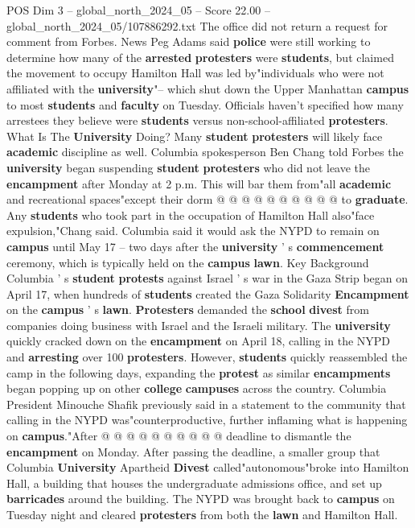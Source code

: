 \begin{textsample}{POS Dim 3 – global\_north\_2024\_05 – Score 22.00 – global\_north\_2024\_05/107886292.txt}
The office did not return a request for comment from Forbes.
News Peg Adams said \textbf{police} were still working to determine how many of the \textbf{arrested} \textbf{protesters} were \textbf{students}, but claimed the movement to occupy Hamilton Hall was led by"individuals who were not affiliated with the \textbf{university}"-- which shut down the Upper Manhattan \textbf{campus} to most \textbf{students} and \textbf{faculty} on Tuesday.
Officials haven't specified how many arrestees they believe were \textbf{students} versus non-school-affiliated \textbf{protesters}.
What Is The \textbf{University} Doing?
Many \textbf{student} \textbf{protesters} will likely face \textbf{academic} discipline as well.
Columbia spokesperson Ben Chang told Forbes the \textbf{university} began suspending \textbf{student} \textbf{protesters} who did not leave the \textbf{encampment} after Monday at 2 p.m.
This will bar them from"all \textbf{academic} and recreational spaces"except their dorm @ @ @ @ @ @ @ @ @ @ to \textbf{graduate}.
Any \textbf{students} who took part in the occupation of Hamilton Hall also"face expulsion,"Chang said.
Columbia said it would ask the NYPD to remain on \textbf{campus} until May 17 -- two days after the \textbf{university} ' s \textbf{commencement} ceremony, which is typically held on the \textbf{campus} \textbf{lawn}.
Key Background Columbia ' s \textbf{student} \textbf{protests} against Israel ' s war in the Gaza Strip began on April 17, when hundreds of \textbf{students} created the Gaza Solidarity \textbf{Encampment} on the \textbf{campus} ' s \textbf{lawn}. \textbf{Protesters} demanded the \textbf{school} \textbf{divest} from companies doing business with Israel and the Israeli military.
The \textbf{university} quickly cracked down on the \textbf{encampment} on April 18, calling in the NYPD and \textbf{arresting} over 100 \textbf{protesters}.
However, \textbf{students} quickly reassembled the camp in the following days, expanding the \textbf{protest} as similar \textbf{encampments} began popping up on other \textbf{college} \textbf{campuses} across the country.
Columbia President Minouche Shafik previously said in a statement to the community that calling in the NYPD was"counterproductive, further inflaming what is happening on \textbf{campus}."After @ @ @ @ @ @ @ @ @ @ deadline to dismantle the \textbf{encampment} on Monday.
After passing the deadline, a smaller group that Columbia \textbf{University} Apartheid \textbf{Divest} called"autonomous"broke into Hamilton Hall, a building that houses the undergraduate admissions office, and set up \textbf{barricades} around the building.
The NYPD was brought back to \textbf{campus} on Tuesday night and cleared \textbf{protesters} from both the \textbf{lawn} and Hamilton Hall.

\end{textsample}
